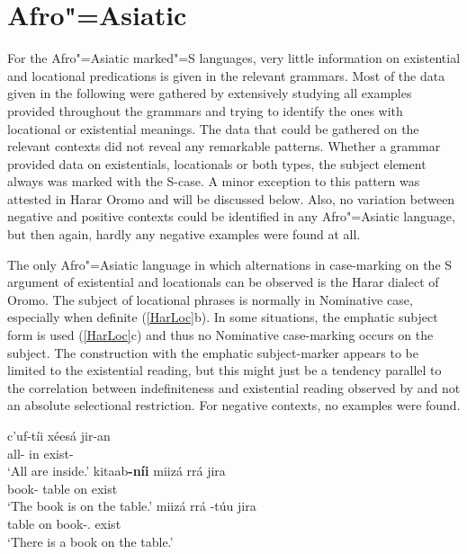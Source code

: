 \section{Afro"=Asiatic}\label{ExistAfro}

For the Afro"=Asiatic marked"=S languages, very little information on existential and locational predications is given in the relevant grammars. 
Most of the data given in the following were gathered by extensively studying all examples provided throughout the grammars and trying to identify the ones with locational or existential meanings.
The data that could be gathered on the relevant contexts did not reveal any remarkable patterns. 
Whether a grammar provided data on existentials, locationals or both types, the subject element always was marked with the S-case. 
A minor exception to this pattern was attested in Harar Oromo and will be discussed below.
Also, no variation between negative and positive contexts could be identified in any Afro"=Asiatic language, but then again, hardly any negative examples were found at all.

The only Afro"=Asiatic language in which alternations in case-marking on the S argument of existential and locationals can be observed is the Harar dialect of Oromo. 
The subject of locational phrases is normally in Nominative case, especially when definite (\ref{HarLoc}b). 
In some situations, the emphatic subject form is used (\ref{HarLoc}c) and thus no Nominative case-marking occurs on the subject. 
The construction with the emphatic subject-marker appears to be limited to the existential reading, but this might just be a tendency parallel to the correlation between indefiniteness and existential reading observed by \citet{Clark:1978} and not an absolute selectional restriction. 
For negative contexts, no examples were found.

\begin{exe}
\ex\label{HarLoc} 
\begin{xlist}
\ex\gll c'uf-t\'ii x\'ees\'a jir-an\\
all-\nom{} in exist-\pl{}\\
\glt `All are inside.'
\ex \gll kitaab\textbf{-n\'ii} miiz\'a rr\'a jira\\
book-\nom{} table on exist\\
\glt `The book is on the table.'
\ex \gll miiz\'a rr\'a -t\'uu jira\\
table on book-\emphat.\sbj{} exist\\
\glt `There is a book on the table.' 
\end{xlist}
\end{exe}


